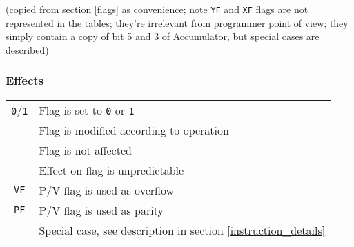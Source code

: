\documentclass[12pt,twoside,openright,a4paper]{book}
\begin{document}
(copied from section \ref{flags} as convenience; note {\tt YF} and {\tt XF} flags are not represented in the tables; they're irrelevant from programmer point of view; they simply contain a copy of bit 5 and 3 of Accumulator, but special cases are described)

\subsubsection{Effects}

\begin{tabular}{cl}
	{\tt 0}/{\tt 1} & Flag is set to {\tt 0} or {\tt 1} \\
	{\tt \FS} & Flag is modified according to operation \\
	{\tt \FN} & Flag is not affected \\
	{\tt \FU} & Effect on flag is unpredictable \\
	{\tt VF} & P/V flag is used as overflow \\
	{\tt PF} & P/V flag is used as parity \\
	{\tt \FX} & Special case, see description in section \ref{instruction_details}
\end{tabular}


\pagebreak

%
%
\end{document}
